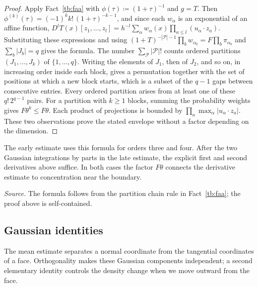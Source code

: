 \begin{proof}
Apply Fact~\ref{tb:faa} with \(\phi(\tau)\coloneqq (1+\tau)^{-1}\) and \(g=T\). Then
\(\phi^{(k)}(\tau)=(-1)^kk!\,(1+\tau)^{-k-1}\), and since each \(w_\alpha\) is
an exponential of an affine function,
\(D^lT(x)[z_1,\ldots,z_l]=h^{-l}\sum_\alpha w_\alpha(x)\prod_{a\le l}
(u_\alpha\cdot z_a)\). Substituting these expressions and using
\((1+T)^{-|\mathcal P|-1}\prod_bw_{\alpha_b}=F\prod_b\pi_{\alpha_b}\) and
\(\sum_b|J_b|=q\) gives the formula. The number
\(\sum_{\mathcal P}|\mathcal P|!\) counts ordered partitions
\((J_1,\ldots,J_k)\) of \(\{1,\ldots,q\}\). Writing the elements of
\(J_1\), then of \(J_2\), and so on, in increasing order inside each block,
gives a permutation together with the set of positions at which a new block
starts, which is a subset of the \(q-1\) gaps between consecutive entries.
Every ordered partition arises from at least one of these
\(q!\,2^{q-1}\) pairs. For a partition with \(k\ge1\) blocks, summing the probability
weights gives \(F\theta^k\le F\theta\). Each product of projections
is bounded by \(\prod_a\max_\alpha|u_\alpha\cdot z_a|\).
These two observations prove the stated envelope without a factor
depending on the dimension.
\end{proof}

The early estimate uses this formula for orders three and four. After
the two Gaussian integrations by parts in the late estimate, the explicit
first and second derivatives above suffice. In both cases the factor
\(F\theta\) connects the derivative estimate to concentration near
the boundary.

\emph{Source.} The formula follows from the partition chain rule in
Fact~\ref{tb:faa}; the proof above is self-contained.

\subsection{Gaussian identities}\label{tb:sec:gauss}

The mean estimate separates a normal coordinate from the tangential
coordinates of a face. Orthogonality makes these Gaussian components
independent; a second elementary identity controls the density change
when we move outward from the face.

